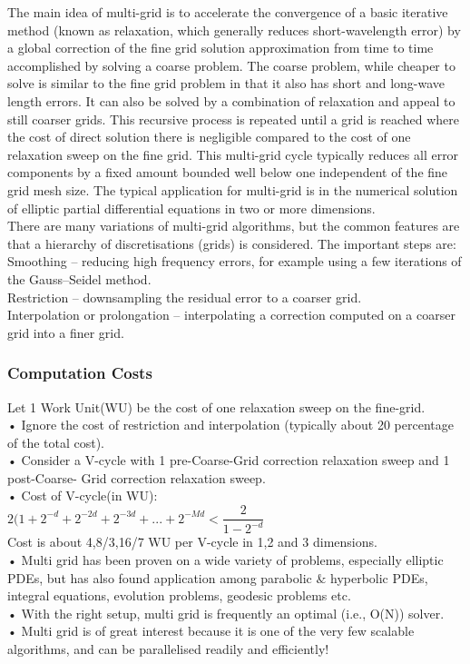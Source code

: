 	The main idea of multi-grid is to accelerate the convergence of a basic iterative method (known as relaxation, which generally reduces short-wavelength error) by a global correction of the fine grid solution approximation from time to time accomplished by solving a coarse problem. The coarse problem, while cheaper to solve is similar to the fine grid problem in that it also has short and long-wave length errors. It can also be solved by a combination of relaxation and appeal to still coarser grids. This recursive process is repeated until a grid is reached where the cost of direct solution there is negligible compared to the cost of one relaxation sweep on the fine grid. This multi-grid cycle typically reduces all error components by a fixed amount bounded well below one independent of the fine grid mesh size. The typical application for multi-grid is in the numerical solution of elliptic partial differential equations in two or more dimensions.\\
	There are many variations of multi-grid algorithms, but the common features are that a hierarchy of discretisations (grids) is considered. The important steps are:\\

Smoothing – reducing high frequency errors, for example using a few iterations of the Gauss–Seidel method.\\
Restriction – downsampling the residual error to a coarser grid.\\
Interpolation or prolongation – interpolating a correction computed on a coarser grid into a finer grid.\\
\subsubsection{Computation Costs}
Let 1 Work Unit(WU) be the cost of one relaxation sweep on the fine-grid.\\
• Ignore the cost of restriction and interpolation (typically about 20 percentage of the total cost).\\
• Consider a V-cycle with 1 pre-Coarse-Grid correction relaxation sweep and 1 post-Coarse- Grid correction relaxation sweep.\\
• Cost of V-cycle(in WU):\\
$2(1+2^{-d}+2^{-2d}+2^{-3d}+...+2^{-Md} < \dfrac{2}{1-2^{-d}}$\\
Cost is about 4,8/3,16/7 WU per V-cycle in 1,2 and 3 dimensions.\\
• Multi grid has been proven on a wide variety of problems, especially elliptic PDEs, but has also found application among parabolic $\&$ hyperbolic PDEs, integral equations, evolution problems, geodesic problems etc.\\
• With the right setup, multi grid is frequently an optimal (i.e., O(N)) solver.\\
• Multi grid is of great interest because it is one of the very few scalable algorithms, and can be parallelised readily and efficiently!\\


